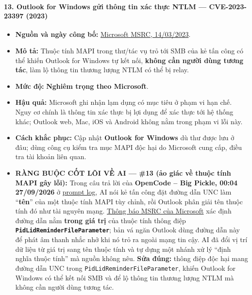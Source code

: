 \paragraph{13. Outlook for Windows gửi thông tin xác thực NTLM --- CVE-2023-23397 (2023)}\label{outlook-for-windows-gux1eedi-thuxf4ng-tin-xuxe1c-thux1ef1c-ntlm-cve-2023-23397-2023}

\begin{itemize}
\tightlist
\item
  \textbf{Nguồn và ngày công bố:} \href{https://www.microsoft.com/en-us/msrc/blog/2023/03/microsoft-mitigates-outlook-elevation-of-privilege-vulnerability}{Microsoft MSRC, 14/03/2023}.
\item
  \textbf{Mô tả:} Thuộc tính MAPI trong thư/tác vụ trỏ tới SMB của kẻ tấn công có thể khiến Outlook for Windows tự kết nối, \textbf{không cần người dùng tương tác}, làm lộ thông tin thương lượng NTLM có thể bị relay.
\item
  \textbf{Mức độ:} \textbf{Nghiêm trọng theo Microsoft}.
\item
  \textbf{Hậu quả:} Microsoft ghi nhận lạm dụng có mục tiêu ở phạm vi hạn chế. Nguy cơ chính là thông tin xác thực bị lợi dụng để xác thực tới hệ thống khác; Outlook web, Mac, iOS và Android không nằm trong phạm vi lỗi này.
\item
  \textbf{Cách khắc phục:} Cập nhật \textbf{Outlook for Windows} dù thư được lưu ở đâu; dùng công cụ kiểm tra mục MAPI độc hại do Microsoft cung cấp, điều tra tài khoản liên quan.
\item
  \textbf{RÀNG BUỘC CỐT LÕI VỀ AI --- \#13 (ảo giác về thuộc tính MAPI gây lỗi):} Trong câu trả lời của \textbf{OpenCode -- Big Pickle, 00:04 27/09/2026} ở \href{Appendix_A_Prompt_Log.md}{prompt log}, AI nói kẻ tấn công đặt đường dẫn UNC làm ``\textbf{tên}'' của một thuộc tính MAPI tùy chỉnh, rồi Outlook phân giải tên thuộc tính đó như tài nguyên mạng. \href{https://www.microsoft.com/en-us/msrc/blog/2023/03/microsoft-mitigates-outlook-elevation-of-privilege-vulnerability}{Thông báo MSRC của Microsoft} xác định đường dẫn nằm \textbf{trong giá trị} của thuộc tính thông điệp \textbf{\texttt{PidLidReminderFileParameter}}; bản vá ngăn Outlook dùng đường dẫn này để phát âm thanh nhắc nhở khi nó trỏ ra ngoài mạng tin cậy. AI đã đổi vị trí dữ liệu từ giá trị sang tên thuộc tính và tự dựng một nhánh xử lý ``định nghĩa thuộc tính'' mà nguồn không nêu. \textbf{Sửa đúng:} thông điệp độc hại mang đường dẫn UNC trong \texttt{PidLidReminderFileParameter}, khiến Outlook for Windows có thể kết nối SMB và để lộ thông tin thương lượng NTLM mà không cần người dùng tương tác.
\end{itemize}

